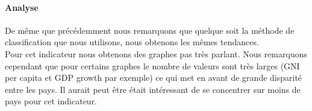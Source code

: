 \paragraph{Analyse}
De même que précédemment nous remarquons que quelque soit la méthode de classification que nous utilisons, nous obtenons les mêmes tendances.\\
Pour cet indicateur nous obtenons des graphes pas très parlant. Nous remarquons cependant que pour certains graphes le nombre de valeurs sont très larges (GNI per capita et GDP growth par exemple) ce qui met en avant de grande disparité entre les pays. Il aurait peut être était intéressant de se concentrer sur moins de pays pour cet indicateur.




